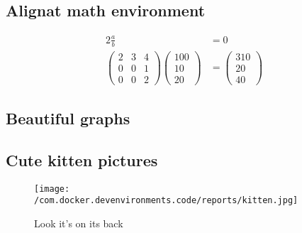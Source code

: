 \documentclass{article}%
\begin{document}
\subsection{Alignat math environment}%
\label{subsec:Alignatmathenvironment}%
\begin{alignat*}{2}%
\frac{a}{b} &= 0 \\%
\begin{pmatrix}%
2&3&4\\%
0&0&1\\%
0&0&2%
\end{pmatrix}%
\begin{pmatrix}%
100\\%
10\\%
20%
\end{pmatrix}%
&=%
\begin{pmatrix}%
310\\%
20\\%
40%
\end{pmatrix}%
\end{alignat*}

%
\subsection{Beautiful graphs}%
\label{subsec:Beautifulgraphs}%

%
\subsection{Cute kitten pictures}%
\label{subsec:Cutekittenpictures}%


\begin{figure}[h!]%
\centering%
\texttt{[image: /com.docker.devenvironments.code/reports/kitten.jpg]}%
\caption{Look it's on its back}%
\end{figure}

%
\end{document}
